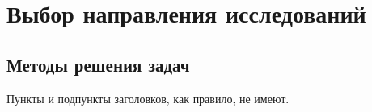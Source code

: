 \section{Выбор направления исследований}

\subsection{Методы решения задач}

Пункты и подпункты заголовков, как правило, не имеют.

\subsubsection{}

\paragraph{}
